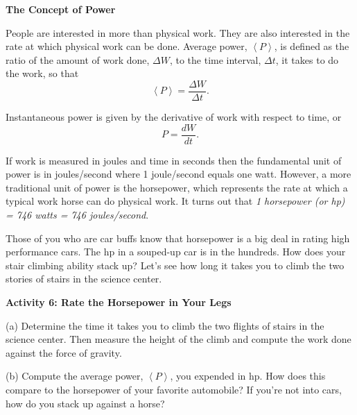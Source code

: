 \textbf{The Concept of Power} 

People are interested in more than physical work. They are also interested in
the rate at which physical work can be done. Average power, \( \left\langle P\right\rangle  \),
is defined as the ratio of the amount of work done, \( \Delta  W\), to the
time interval, \( \Delta  t\), it takes to do the work, so that
\[
\left\langle P\right\rangle =\frac{\Delta W}{\Delta t}.\]


Instantaneous power is given by the derivative of work with respect to time,
or
\[
P=\frac{dW}{dt}.\]


If work is measured in joules and time in seconds then the fundamental unit
of power is in joules/second where 1 joule/second equals one watt. However,
a more traditional unit of power is the horsepower, which represents the rate
at which a typical work horse can do physical work. It turns out that \textit{1
horsepower (or hp) = 746 watts = 746 joules/second}.

Those of you who are car buffs know that horsepower is a big deal in rating
high performance cars. The hp in a souped-up car is in the hundreds. How does
your stair climbing ability stack up? Let's see how long it takes you to climb
the two stories of stairs in the science center.

\textbf{Activity 6: Rate the Horsepower in Your Legs} 

(a) Determine the time it takes you to climb the two flights of stairs in
the science center. Then measure the height of the climb and compute the work
done against the force of gravity.
\vspace{25mm}

(b) Compute the average power, \( \left\langle P\right\rangle  \), you expended
in hp. How does this compare to the horsepower of your favorite automobile?
If you're not into cars, how do you stack up against a horse?

